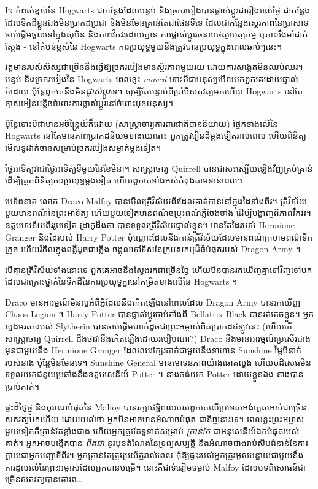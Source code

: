 
\lettrine{I}{n} កំពស់ខ្ពស់នៃ Hogwarts ជាកន្លែងដែលបន្ទប់ និងច្រករបៀងបានផ្លាស់ប្តូរជារៀងរាល់ថ្ងៃ ជាកន្លែងដែលទឹកដីខ្លួនឯងមិនប្រាកដប្រជា និងមិនមែនគ្រាន់តែជាផែនទីទេ ដែលជាកន្លែងស្ថេរភាពនៃប្រាសាទចាប់ផ្តើមចូលទៅក្នុងសុបិន និងភាពវឹកវរដោយគ្មាន ការផ្លាស់ប្តូររចនាបថស្ថាបត្យកម្ម ឬភាពរឹងមាំជាក់ស្តែង - នៅតំបន់ខ្ពស់នៃ Hogwarts ការប្រយុទ្ធមួយនឹងត្រូវបានប្រយុទ្ធក្នុងពេលឆាប់ៗនេះ។

វត្តមាន​របស់​សិស្ស​ជាច្រើន​នឹង​ធ្វើឱ្យ​ច្រករបៀង​មាន​ស្ថិរភាព​មួយរយៈ​ដោយ​ការ​សង្កេត​មិន​ឈប់ឈរ។ បន្ទប់ និងច្រករបៀងនៃ Hogwarts ពេលខ្លះ \emph{moved} ទោះបីជាមនុស្សមើលមកពួកគេដោយផ្ទាល់ក៏ដោយ ប៉ុន្តែពួកគេនឹងមិន\emph{ផ្លាស់ប្តូរ}ទេ។ សូម្បីតែបន្ទាប់ពីប្រាំបីសតវត្សមកហើយ Hogwarts នៅតែខ្មាស់អៀនបន្តិចចំពោះការផ្លាស់ប្តូរនៅចំពោះមុខមនុស្ស។

ប៉ុន្តែទោះបីជាមានអចិន្ត្រៃយ៍ក៏ដោយ (សាស្ត្រាចារ្យការពារជាតិបាននិយាយ) ផ្នែកខាងលើនៃ Hogwarts នៅតែមានភាពប្រាកដនិយមខាងយោធា៖ អ្នកត្រូវរៀនដីម្តងទៀតរាល់ពេល ហើយពិនិត្យមើលទូដាក់ចានសម្រាប់ច្រករបៀងសម្ងាត់ម្តងទៀត។

ថ្ងៃអាទិត្យវាជាថ្ងៃអាទិត្យទីមួយនៃខែមីនា។ សាស្រ្តាចារ្យ Quirrell បានជាសះស្បើយឡើងវិញគ្រប់គ្រាន់ដើម្បីត្រួតពិនិត្យការប្រយុទ្ធម្តងទៀត ហើយពួកគេទាំងអស់កំពុងតាមទាន់ពេល។

មេទ័ពនាគ លោក Draco Malfoy បានមើលត្រីវិស័យពីរដែលគាត់កាន់នៅក្នុងដៃទាំងពីរ។ ត្រីវិស័យមួយមានពណ៌នៃព្រះអាទិត្យ ហើយមួយទៀតមានពណ៌ចម្រុះពណ៌ភ្លឺចែងចាំង ដើម្បីបង្ហាញពីភាពវឹកវរ។ ឧត្តមសេនីយពីររូបទៀត ដ្រាកូដឹងថា បានទទួលត្រីវិស័យផ្ទាល់ខ្លួន។ មានតែដៃរបស់ Hermione Granger និងដៃរបស់ Harry Potter ប៉ុណ្ណោះដែលនឹងកាន់ត្រីវិស័យដែលមានពណ៌ក្រហមពណ៌ទឹកក្រូច ហើយរំកិលក្នុងពន្លឺដូចជាភ្លើង ចង្អុលទៅទិសនៃក្រុមសកម្មដ៏ធំបំផុតរបស់ Dragon Army ។

បើគ្មានត្រីវិស័យទាំងនោះទេ ពួកគេអាចនឹងស្វែងរកជាច្រើនថ្ងៃ ហើយមិនបានរកឃើញគ្នាទៅវិញទៅមក ដែលជាគ្រោះថ្នាក់នៃទឹកដីនៃការប្រយុទ្ធគ្នានៅកម្រិតខាងលើនៃ Hogwarts ។

Draco មានអារម្មណ៍មិនល្អអំពីអ្វីដែលនឹងកើតឡើងនៅពេលដែល Dragon Army បានរកឃើញ Chaos Legion ។ Harry Potter បានផ្លាស់ប្តូរចាប់តាំងពី Bellatrix Black បានរត់គេចខ្លួន។ អ្នកស្នងមរតករបស់ Slytherin បានចាប់ផ្តើមហាក់ដូចជាព្រះអម្ចាស់ពិតប្រាកដឥឡូវនេះ (ហើយតើសាស្រ្តាចារ្យ Quirrell ដឹងថាវានឹងកើតឡើងដោយរបៀបណា?) Draco នឹងមានអារម្មណ៍ប្រសើរជាងមុនជាមួយនឹង Hermione Granger ដែលឈរក្បែរគាត់ជាមួយនឹងទាហាន Sunshine ម្ភៃបីនាក់របស់នាង ប៉ុន្តែមិនមែនទេ។ Sunshine General មានមោទនភាពយ៉ាងឆោតល្ងង់ ហើយបដិសេធមិនទទួលយកជំនួយប្រឆាំងនឹងឧត្តមសេនីយ៍ Potter ។ នាងចង់យក Potter ដោយខ្លួនឯង នាងបានប្រាប់គាត់។

ផ្ទះដ៏ថ្លៃថ្នូ និងបុរាណបំផុតនៃ Malfoy បានរក្សាឥទ្ធិពលរបស់ពួកគេលើប្រទេសអង់គ្លេសអស់ជាច្រើនសតវត្សមកហើយ ដោយយល់ថា អ្នកមិនអាចមានអំណាចបំផុត \emph{} ជានិច្ចនោះទេ។ ពេលខ្លះព្រះអម្ចាស់មួយទៀតគឺគ្រាន់តែខ្លាំងជាង ហើយអ្នកត្រូវតែទូទាត់សម្រាប់ \emph{គ្រាន់តែ} ជាអនុសេនីយ៍ឯកបំផុតរបស់គាត់។ អ្នកអាចបង្កើតបាន \emph{ពិតជា} នូវមុខតំណែងនៃទ្រព្យសម្បត្តិ និងអំណាចជាងរាប់សិបជំនាន់នៃការក្លាយជាអ្នកបញ្ជាទីពីរ។ អ្នកគ្រាន់តែត្រូវប្រយ័ត្នរាល់ពេល កុំឱ្យផ្ទះរបស់អ្នកត្រូវអូសបន្លាយជាមួយនឹងការដួលរលំនៃព្រះអម្ចាស់ដែលអ្នកបានបម្រើ។ នោះគឺជាទំនៀមទម្លាប់ Malfoy ដែលបទពិសោធន៍ជាច្រើនសតវត្សបានគោរព…

